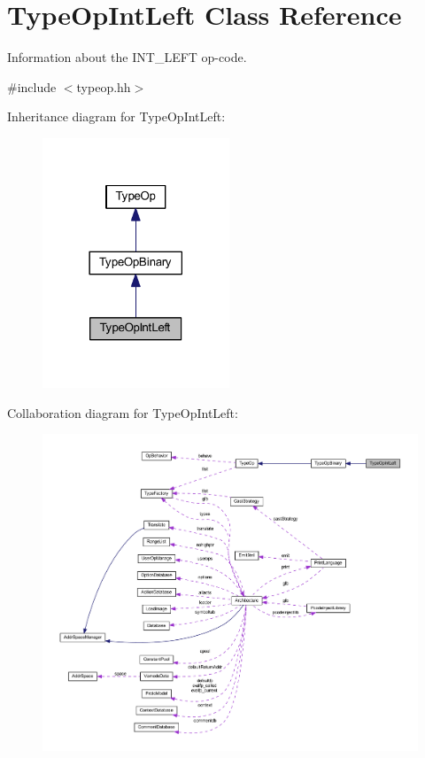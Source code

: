 \hypertarget{class_type_op_int_left}{}\section{Type\+Op\+Int\+Left Class Reference}
\label{class_type_op_int_left}


Information about the I\+N\+T\+\_\+\+L\+E\+FT op-\/code.  




{\ttfamily \#include $<$typeop.\+hh$>$}



Inheritance diagram for Type\+Op\+Int\+Left\+:
\nopagebreak
\begin{figure}[H]
\begin{center}
\leavevmode
\includegraphics[width=158pt]{class_type_op_int_left__inherit__graph}
\end{center}
\end{figure}


Collaboration diagram for Type\+Op\+Int\+Left\+:
\nopagebreak
\begin{figure}[H]
\begin{center}
\leavevmode
\includegraphics[width=350pt]{class_type_op_int_left__coll__graph}
\end{center}
\end{figure}
